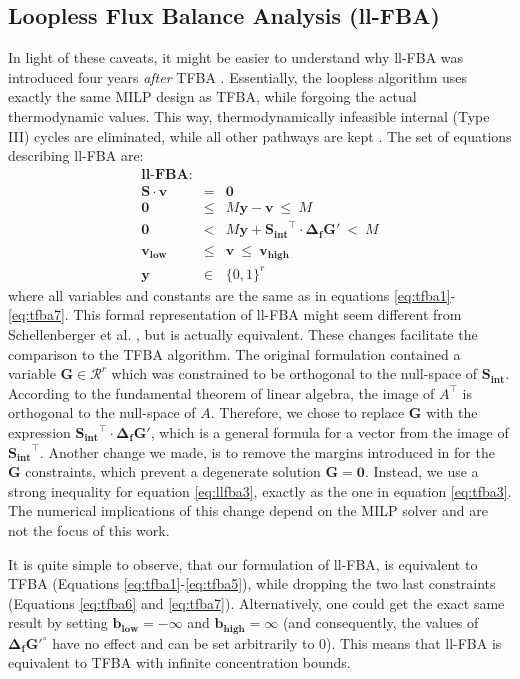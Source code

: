 \documentclass[twocolumn]{bmcart}%
\newcommand{\Sint}{\mathbf{S_{int}}}
\begin{document}
\subsection*{Loopless Flux Balance Analysis (ll-FBA)}
In light of these caveats, it might be easier to understand why ll-FBA was introduced four years \emph{after} TFBA \cite{Schellenberger2011-bq}. Essentially, the loopless algorithm uses exactly the same MILP design as TFBA, while forgoing the actual thermodynamic values. This way, thermodynamically infeasible internal (Type III) cycles are eliminated, while all other pathways are kept \cite{Noor2012-qb}. The set of equations describing ll-FBA are:
\begin{eqnarray}
\textbf{ll-FBA:} && \nonumber\\
\mathbf{S} \cdot \mathbf{v} &=& \mathbf{0} \label{eq:llfba1} \\
\mathbf{0} &\leq& M \mathbf{y} - \mathbf{v} ~\leq~ M
\label{eq:llfba2} \\
\mathbf{0} &<& M \mathbf{y} + \Sint ^\top \cdot \mathbf{\Delta_f G'} ~<~ M \label{eq:llfba3} \\
\mathbf{v_{low}} &\leq& \mathbf{v} ~\leq~ \mathbf{v_{high}} \\
\mathbf{y} &\in& \{0, 1\}^r
\end{eqnarray}
where all variables and constants are the same as in equations \ref{eq:tfba1}-\ref{eq:tfba7}. This formal representation of ll-FBA might seem different from Schellenberger et al. \cite{Schellenberger2011-bq}, but is actually equivalent. These changes facilitate the comparison to the TFBA algorithm. The original formulation contained a variable $\mathbf{G} \in \mathcal{R}^{r}$ which was constrained to be orthogonal to the null-space of $\Sint$. According to the fundamental theorem of linear algebra, the image of $A^\top$ is orthogonal to the null-space of $A$. Therefore, we chose to replace $\mathbf{G}$ with the expression $\Sint^\top \cdot \mathbf{\Delta_f G'}$, which is a general formula for a vector from the image of $\Sint^\top$. Another change we made, is to remove the margins introduced in \cite{Schellenberger2011-bq} for the $\mathbf{G}$ constraints, which prevent a degenerate solution $\mathbf{G} = \mathbf{0}$. Instead, we use a strong inequality for equation \ref{eq:llfba3}, exactly as the one in equation \ref{eq:tfba3}. The numerical implications of this change depend on the MILP solver and are not the focus of this work.

It is quite simple to observe, that our formulation of ll-FBA, is equivalent to TFBA (Equations \ref{eq:tfba1}-\ref{eq:tfba5}), while dropping the two last constraints (Equations \ref{eq:tfba6} and \ref{eq:tfba7}). Alternatively, one could get the exact same result by setting $\mathbf{b_{low}} = -\infty$ and $\mathbf{b_{high}} = \infty$ (and consequently, the values of $\mathbf{\Delta_f G'^\circ}$ have no effect and can be set arbitrarily to 0). This means that ll-FBA is equivalent to TFBA with infinite concentration bounds.
\end{document}
